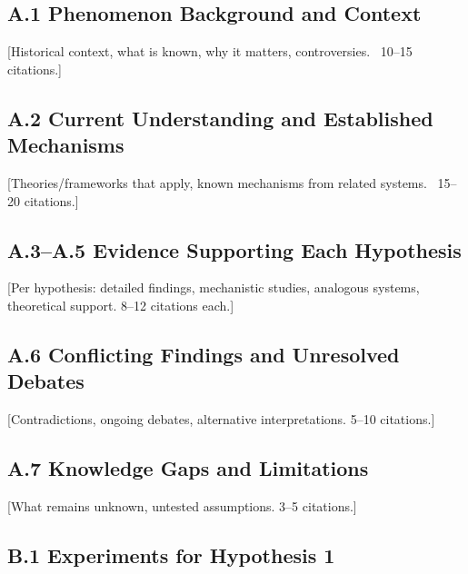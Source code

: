 \documentclass[11pt,letterpaper]{article}
\begin{document}
\newpage
\appendix

\subsection*{A.1 Phenomenon Background and Context}
[Historical context, what is known, why it matters, controversies. ~10--15 citations.]
\subsection*{A.2 Current Understanding and Established Mechanisms}
[Theories/frameworks that apply, known mechanisms from related systems. ~15--20 citations.]
\subsection*{A.3--A.5 Evidence Supporting Each Hypothesis}
[Per hypothesis: detailed findings, mechanistic studies, analogous systems, theoretical support. 8--12 citations each.]
\subsection*{A.6 Conflicting Findings and Unresolved Debates}
[Contradictions, ongoing debates, alternative interpretations. 5--10 citations.]
\subsection*{A.7 Knowledge Gaps and Limitations}
[What remains unknown, untested assumptions. 3--5 citations.]

\newpage
{}
\subsection*{B.1 Experiments for Hypothesis 1}
\end{document}
